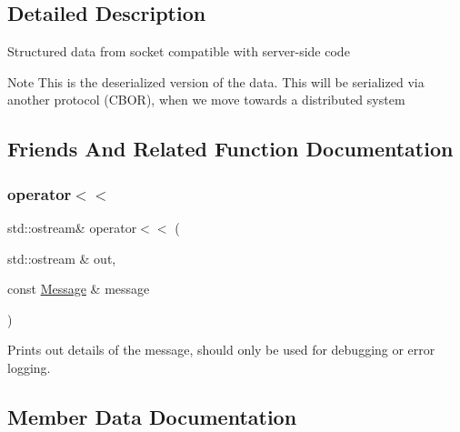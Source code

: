 \subsection{Detailed Description}
Structured data from socket compatible with server-\/side code \begin{DoxyNote}{Note}
This is the \textquotesingle{}deserialized\textquotesingle{} version of the data. This will be serialized via another protocol (C\+B\+OR), when we move towards a distributed system 
\end{DoxyNote}


\subsection{Friends And Related Function Documentation}
\mbox{\label{structshaan97_1_1sync_1_1_message_abb79787d78c9a91699bd7841005df5f7}} 
\subsubsection{\texorpdfstring{operator$<$$<$}{operator<<}}
{\footnotesize\ttfamily std\+::ostream\& operator$<$$<$ (\begin{DoxyParamCaption}\item[{std\+::ostream \&}]{out,  }\item[{const \hyperlink{structshaan97_1_1sync_1_1_message}{Message} \&}]{message }\end{DoxyParamCaption})\hspace{0.3cm}{\ttfamily [friend]}}



Prints out details of the message, should only be used for debugging or error logging. 



\subsection{Member Data Documentation}
\mbox{\label{structshaan97_1_1sync_1_1_message_a92f154226ebe0ff83eaec8885927c605}} 
